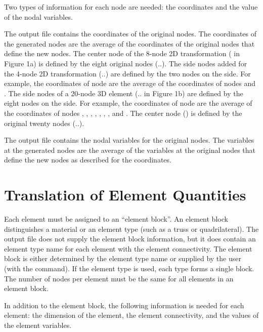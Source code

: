 Two types of information for each node are needed: the
coordinates and the value of the nodal variables.

The  output file contains the coordinates of the
original nodes.
The coordinates of the generated nodes
are the average of the coordinates of the original nodes that define the
new nodes. The center node of the 8-node 2D transformation (
in Figure 1a) is defined by the eight original nodes
(..). The side nodes added for the 4-node 2D
transformation (..) are defined by the two nodes
on the side. For example, the coordinates of node  are the
average of the coordinates of nodes  and . The
side nodes of a 20-node 3D element (.. in Figure
1b) are defined by the eight nodes on the side. For example, the
coordinates of node  are the average of the coordinates of
nodes , , , , ,
, , and . The center node
() is defined by the original twenty nodes
(..).

The  output file contains the nodal variables for
the original nodes.
The variables at the
generated nodes are the average of the variables at the original nodes
that define the new nodes as described for the coordinates.

\section{Translation of Element Quantities} \label{intro:element}

Each element must be assigned to an ``element block''. An element block
distinguishes a material or an element type (such as a truss or
quadrilateral). The  output file does not supply the
element block information, but it does contain an element type name for
each element with the element connectivity. The element block is either
determined by the element type name or supplied by the user (with the
 command). If the element type is used, each type forms a
single block. The number of nodes per element must be the same for all
elements in an element block.

In addition to the element block, the following information is needed
for each element: the dimension of the element, the element
connectivity, and the values of the element variables.

